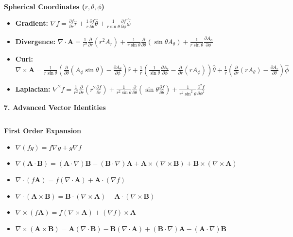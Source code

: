 \documentclass[10pt, landscape, twocolumn]{article}
\newcommand{\cheatsheetsection}[1]{
    \vspace{0.8em}
    {\color{themeblue}\large\bfseries #1} \par
    \vspace{-0.4em}
    {\color{themeblue}\rule{\linewidth}{1pt}} \par
    \vspace{0.3em}
}
\newcommand{\cheatsheetsubsection}[1]{
    \vspace{0.5em}
    {\color{themeblue}\normalsize\bfseries #1} \par
    \vspace{0.2em}
}
\begin{document}
\cheatsheetsubsection{Spherical Coordinates ($r, \theta, \phi$)}
\begin{itemize}[leftmargin=*, nosep]
    \item \textbf{Gradient:} $\nabla f = \frac{\partial f}{\partial r}\hat{r} + \frac{1}{r}\frac{\partial f}{\partial \theta}\hat{\theta} + \frac{1}{r\sin\theta}\frac{\partial f}{\partial \phi}\hat{\phi}$
    \item \textbf{Divergence:} $\nabla \cdot \mathbf{A} = \frac{1}{r^2}\frac{\partial}{\partial r}(r^2 A_r) + \frac{1}{r\sin\theta}\frac{\partial}{\partial \theta}(\sin\theta A_\theta) + \frac{1}{r\sin\theta}\frac{\partial A_\phi}{\partial \phi}$
    \item \textbf{Curl:} $\nabla \times \mathbf{A} = \frac{1}{r\sin\theta}\left( \frac{\partial}{\partial \theta}(A_\phi \sin\theta) - \frac{\partial A_\theta}{\partial \phi} \right)\hat{r} + \frac{1}{r}\left( \frac{1}{\sin\theta}\frac{\partial A_r}{\partial \phi} - \frac{\partial}{\partial r}(r A_\phi) \right)\hat{\theta} + \frac{1}{r}\left( \frac{\partial}{\partial r}(r A_\theta) - \frac{\partial A_r}{\partial \theta} \right)\hat{\phi}$
    \item \textbf{Laplacian:} $\nabla^2 f = \frac{1}{r^2}\frac{\partial}{\partial r}\left(r^2 \frac{\partial f}{\partial r}\right) + \frac{1}{r^2\sin\theta}\frac{\partial}{\partial \theta}\left(\sin\theta \frac{\partial f}{\partial \theta}\right) + \frac{1}{r^2\sin^2\theta}\frac{\partial^2 f}{\partial \phi^2}$
\end{itemize}

\cheatsheetsection{7. Advanced Vector Identities}
\cheatsheetsubsection{First Order Expansion}
\begin{itemize}[leftmargin=*, nosep]
    \item $\nabla (fg) = f \nabla g + g \nabla f$
    \item $\nabla (\mathbf{A} \cdot \mathbf{B}) = (\mathbf{A} \cdot \nabla)\mathbf{B} + (\mathbf{B} \cdot \nabla)\mathbf{A} + \mathbf{A} \times (\nabla \times \mathbf{B}) + \mathbf{B} \times (\nabla \times \mathbf{A})$
    \item $\nabla \cdot (f \mathbf{A}) = f (\nabla \cdot \mathbf{A}) + \mathbf{A} \cdot (\nabla f)$
    \item $\nabla \cdot (\mathbf{A} \times \mathbf{B}) = \mathbf{B} \cdot (\nabla \times \mathbf{A}) - \mathbf{A} \cdot (\nabla \times \mathbf{B})$
    \item $\nabla \times (f \mathbf{A}) = f (\nabla \times \mathbf{A}) + (\nabla f) \times \mathbf{A}$
    \item $\nabla \times (\mathbf{A} \times \mathbf{B}) = \mathbf{A}(\nabla \cdot \mathbf{B}) - \mathbf{B}(\nabla \cdot \mathbf{A}) + (\mathbf{B} \cdot \nabla)\mathbf{A} - (\mathbf{A} \cdot \nabla)\mathbf{B}$
\end{itemize}
\end{document}
